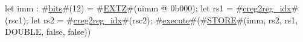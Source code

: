 let imm : #\hyperref[sailRISCVzbits]{bits}#(12) = #\hyperref[sailRISCVzEXTZ]{EXTZ}#(uimm @ 0b000);
let rs1 = #\hyperref[sailRISCVzcreg2regzyidx]{creg2reg\_idx}#(rsc1);
let rs2 = #\hyperref[sailRISCVzcreg2regzyidx]{creg2reg\_idx}#(rsc2);
#\hyperref[sailRISCVzexecute]{execute}#(#\hyperref[sailRISCVzSTORE]{STORE}#(imm, rs2, rs1, DOUBLE, false, false))
